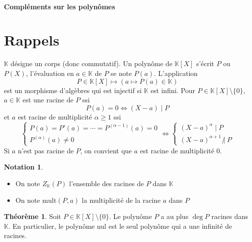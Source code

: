 \documentclass{article}
\theoremstyle{definition}
\newtheorem*{thm}{Théorème}
\newtheorem*{notation}{Notation}
\begin{document}
~

\vspace{1cm}

\begin{center}
\textbf{\LARGE Compléments sur les polynômes} \\[1em]
\end{center}
\tableofcontents
\thispagestyle{empty}

\newpage
\setcounter{page}{1}
\section{Rappels}

$\mathbb K$ désigne un corps (donc commutatif). Un polynôme de $\mathbb K[X]$ s'écrit $P$ ou $P(X)$, l'évaluation en $a\in\mathbb K$ de $P$ se note $P(a)$. L'application \[
    P\in\mathbb K[X] \longmapsto (a\longmapsto P(a)\in\mathbb K)
\]
est un morphisme d'algèbres qui est injectif si $\mathbb K$ est infini. Pour $P\in\mathbb K[X]\setminus \{0\}$, $a\in\mathbb K$ est une racine de $P$ ssi \[
    P(a)=0\iff (X-a)\;|\;P
\]
et $a$ est racine de multiplicité $\alpha \geq 1$ ssi \[
    \begin{cases}
        P(a)=P'(a)=\cdots=P^{(\alpha - 1)}(a)=0 \\
        P^{(\alpha)}(a)\neq 0
    \end{cases}
    \iff \begin{cases}
        (X-a)^\alpha \; |\; P\\
        (X-a)^{\alpha+1}\;\not|\;P
    \end{cases}
\]
Si $a$ n'est pas racine de $P$, on convient que $a$ est racine de multiplicité $0$.

\begin{notation} ~
    \begin{itemize}
        \item
            On note $Z_\mathbb K(P)$ l'ensemble des racines de $P$ dans $\mathbb K$
        \item On note $\mathrm{mult}(P, a)$ la multiplicité de la racine $a$ dans $P$
    \end{itemize}
\end{notation}

\begin{thm}
    Soit $P\in \mathbb K[X]\setminus \{0\}$. Le polynôme $P$ a au plus $\deg P$ racines dans $\mathbb K$.
    En particulier, le polynôme nul est le seul polynôme qui a une infinité de racines.
\end{thm}
\end{document}
